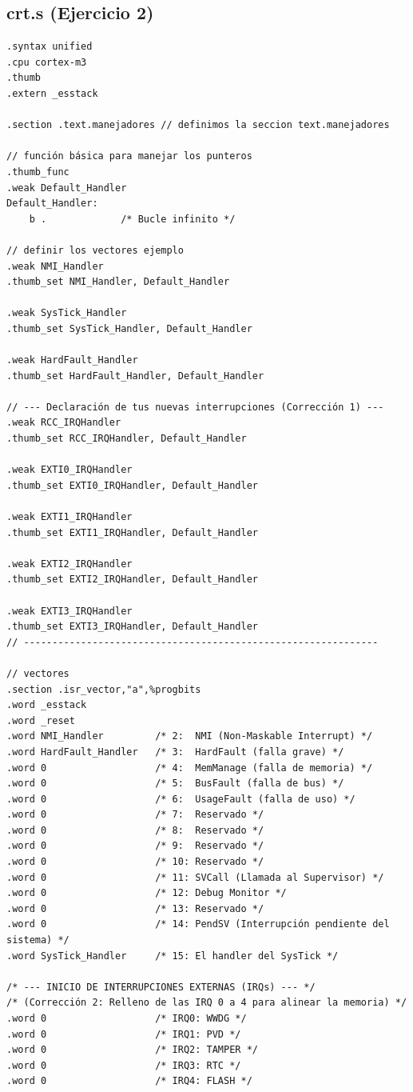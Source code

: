 \subsection{crt.s (Ejercicio 2)}
\begin{lstlisting}[language=MyMake]
.syntax unified 
.cpu cortex-m3
.thumb
.extern _esstack

.section .text.manejadores // definimos la seccion text.manejadores 

// función básica para manejar los punteros 
.thumb_func 
.weak Default_Handler
Default_Handler:
    b .             /* Bucle infinito */

// definir los vectores ejemplo
.weak NMI_Handler
.thumb_set NMI_Handler, Default_Handler

.weak SysTick_Handler
.thumb_set SysTick_Handler, Default_Handler

.weak HardFault_Handler
.thumb_set HardFault_Handler, Default_Handler

// --- Declaración de tus nuevas interrupciones (Corrección 1) ---
.weak RCC_IRQHandler
.thumb_set RCC_IRQHandler, Default_Handler

.weak EXTI0_IRQHandler
.thumb_set EXTI0_IRQHandler, Default_Handler

.weak EXTI1_IRQHandler
.thumb_set EXTI1_IRQHandler, Default_Handler

.weak EXTI2_IRQHandler
.thumb_set EXTI2_IRQHandler, Default_Handler

.weak EXTI3_IRQHandler
.thumb_set EXTI3_IRQHandler, Default_Handler
// --------------------------------------------------------------

// vectores 
.section .isr_vector,"a",%progbits
.word _esstack
.word _reset
.word NMI_Handler         /* 2:  NMI (Non-Maskable Interrupt) */
.word HardFault_Handler   /* 3:  HardFault (falla grave) */
.word 0                   /* 4:  MemManage (falla de memoria) */
.word 0                   /* 5:  BusFault (falla de bus) */
.word 0                   /* 6:  UsageFault (falla de uso) */
.word 0                   /* 7:  Reservado */
.word 0                   /* 8:  Reservado */
.word 0                   /* 9:  Reservado */
.word 0                   /* 10: Reservado */
.word 0                   /* 11: SVCall (Llamada al Supervisor) */
.word 0                   /* 12: Debug Monitor */
.word 0                   /* 13: Reservado */
.word 0                   /* 14: PendSV (Interrupción pendiente del sistema) */
.word SysTick_Handler     /* 15: El handler del SysTick */

/* --- INICIO DE INTERRUPCIONES EXTERNAS (IRQs) --- */
/* (Corrección 2: Relleno de las IRQ 0 a 4 para alinear la memoria) */
.word 0                   /* IRQ0: WWDG */
.word 0                   /* IRQ1: PVD */
.word 0                   /* IRQ2: TAMPER */
.word 0                   /* IRQ3: RTC */
.word 0                   /* IRQ4: FLASH */


\end{lstlisting}
